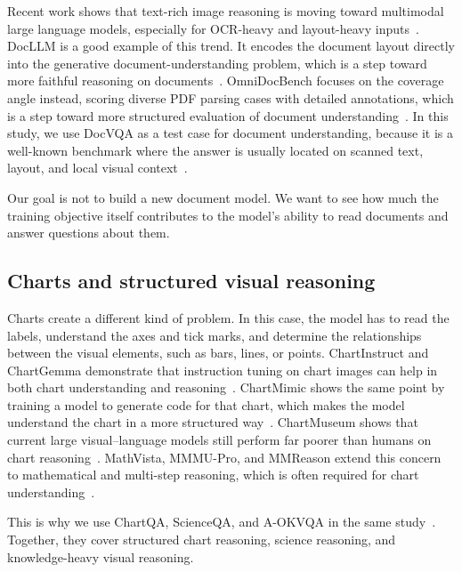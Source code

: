\documentclass[preprint,12pt]{elsarticle}
\begin{document}
Recent work shows that text-rich image reasoning is moving toward multimodal large language models, especially for OCR-heavy and layout-heavy inputs~\cite{fu2025textrichsurvey}.
DocLLM is a good example of this trend. It encodes the document layout directly into the generative document-understanding problem,
which is a step toward more faithful reasoning on documents~\cite{wang2024docllm}.
OmniDocBench focuses on the coverage angle instead, scoring diverse PDF parsing cases with detailed annotations,
which is a step toward more structured evaluation of document understanding~\cite{ouyang2025omnidocbench}.
In this study, we use DocVQA as a test case for document understanding, because it is a well-known benchmark 
where the answer is usually located on scanned text, layout, and local visual context~\cite{mathew2021docvqa}.

Our goal is not to build a new document model.
We want to see how much the training objective itself contributes to the model's ability to read documents and answer questions about them.

\subsection{Charts and structured visual reasoning}
Charts create a different kind of problem.
In this case, the model has to read the labels, understand the axes and tick marks,
and determine the relationships between the visual elements, such as bars, lines, or points.
ChartInstruct and ChartGemma demonstrate that instruction tuning on chart images can help in both chart understanding and reasoning~\cite{masry2024chartinstruct,masry2025chartgemma}.
ChartMimic shows the same point by training a model to generate code for that chart, which makes the model understand the chart in a more structured way~\cite{yang2025chartmimic}.
ChartMuseum shows that current large visual--language models still perform far poorer than humans on chart reasoning~\cite{tang2025chartmuseum}.
MathVista, MMMU-Pro, and MMReason extend this concern to mathematical and multi-step reasoning, which is often required for chart understanding~\cite{lu2024mathvista,yue2025mmmupro,yao2025mmreason}.

This is why we use ChartQA, ScienceQA, and A-OKVQA in the same study~\cite{masry2022chartqa,lu2022scienceqa,schwenk2022aokvqa}.
Together, they cover structured chart reasoning, science reasoning, and knowledge-heavy visual reasoning.
\end{document}
